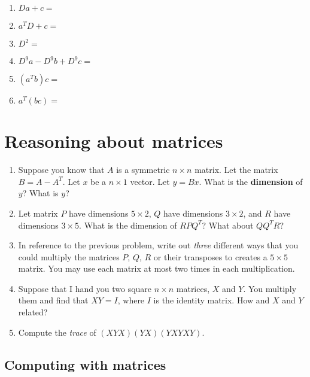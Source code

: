 \documentclass[11pt,onecolumn,superscriptaddress,notitlepage]{article}
\begin{document}
\begin{enumerate}[resume]
	\item $Da + c =$
	\item $a^{T}D + c = $
	\item $D^2=$
	\item $D^9 a - D^9b + D^9c = $
	\item $(a^T b) c = $
	\item $a^T (b c) = $
\end{enumerate}

\clearpage
\section*{Reasoning about matrices} 

\begin{enumerate}[resume]
	\item Suppose you know that $A$ is a symmetric $n \times n$ matrix. Let the matrix $B = A-A^{T}$. Let $x$ be a $n \times 1$ vector. Let $y=Bx$.  What is the {\bf dimension} of $y$? What is $y$?
	\item Let matrix $P$ have dimensions $5 \times 2$, $Q$ have dimensions $3 \times 2$, and $R$ have dimensions $3 \times 5$.  What is the dimension of $RPQ^{T}$? What about $QQ^{T}R$?
	\item In reference to the previous problem, write out {\it three} different ways that you could multiply the matrices $P$, $Q$, $R$ or their transposes to creates a $5 \times 5$ matrix. You may use each matrix at most two times in each multiplication.
	\item Suppose that I hand you two square $n\times n$ matrices, $X$ and $Y$. You multiply them and find that $XY=I$, where $I$ is the identity matrix. How and $X$ and $Y$ related?
	\item Compute the {\it trace} of $(XYX)(YX)(YXYXY)$.
\end{enumerate}

\clearpage
\subsection*{Computing with matrices}
\end{document}
